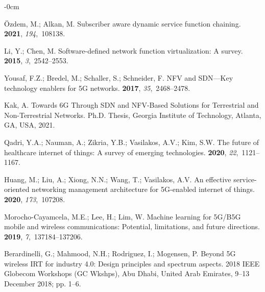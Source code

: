 \documentclass[futureinternet,review,accept,pdftex,moreauthors]{Definitions/mdpi}
\begin{document}
\begin{adjustwidth}{-\extralength}{0cm}
\begin{thebibliography}{999}
{\"O}zdem, M.; Alkan, M.
\newblock Subscriber aware dynamic service function chaining.
 {\bf 2021}, {\em 194},~108138.

Li, Y.; Chen, M.
\newblock Software-defined network function virtualization: A survey.
 {\bf 2015}, {\em 3},~2542--2553.

Yousaf, F.Z.; Bredel, M.; Schaller, S.; Schneider, F.
\newblock NFV and SDN---Key technology enablers for 5G networks.
 {\bf 2017},
  {\em 35},~2468--2478.

Kak, A.
\newblock Towards 6G Through SDN and NFV-Based Solutions for Terrestrial and
  Non-Terrestrial Networks.
\newblock Ph.D. Thesis, Georgia Institute of Technology,  {Atlanta, GA, USA,} %
2021.

Qadri, Y.A.; Nauman, A.; Zikria, Y.B.; Vasilakos, A.V.; Kim, S.W.
\newblock The future of healthcare internet of things: A survey of emerging
  technologies.
 {\bf 2020}, {\em
  22},~1121--1167.

Huang, M.; Liu, A.; Xiong, N.N.; Wang, T.; Vasilakos, A.V.
\newblock An effective service-oriented networking management architecture for
  5G-enabled internet of things.
 {\bf 2020}, {\em 173},~107208.

Morocho-Cayamcela, M.E.; Lee, H.; Lim, W.
\newblock Machine learning for 5G/B5G mobile and wireless communications:
  Potential, limitations, and future directions.
 {\bf 2019}, {\em 7},~137184--137206.

Berardinelli, G.; Mahmood, N.H.; Rodriguez, I.; Mogensen, P.
\newblock Beyond 5G wireless IRT for industry 4.0: Design principles and
  spectrum aspects.
  2018 IEEE Globecom Workshops (GC Wkshps),  Abu Dhabi, United Arab Emirates,  9--13 December 2018; pp. 1--6.


\end{thebibliography}
\end{adjustwidth}
\end{document}
